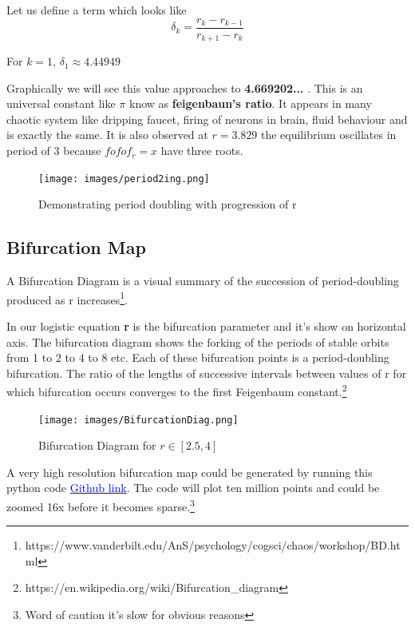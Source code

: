 \documentclass{report}
\begin{document}
Let us define a term which looks like
\begin{equation}
    \delta_k = \frac{r_k - r_{k-1}}{r_{k+1} - r_k}
\end{equation}

For $k = 1$, $\delta_1 \approx 4.44949$ \newline

Graphically we will see this value approaches to \textbf{4.669202...} . This is an universal constant like $\pi$ know as \textbf{feigenbaun's ratio}. It appears in many chaotic system like dripping faucet, firing of neurons in brain, fluid behaviour and is exactly the same.
It is also observed at $r = 3.829$ the equilibrium oscillates in period of 3 because $fofof_r = x$ have three roots. \newline

\begin{figure}[!h]
    \centering
    \texttt{[image: images/period2ing.png]}
    \caption{Demonstrating period doubling with progression of r}
    \label{fig:my_label3}
\end{figure}

\subsection{Bifurcation Map}
\raggedright
A Bifurcation Diagram is a visual summary of the succession of period-doubling produced as r increases\footnote[1]{https://www.vanderbilt.edu/AnS/psychology/cogsci/chaos/workshop/BD.html}.

In our logistic equation \textbf{r} is the bifurcation parameter and it's show on horizontal axis. The bifurcation diagram shows the forking of the periods of stable orbits from 1 to 2 to 4 to 8 etc. Each of these bifurcation points is a period-doubling bifurcation. The ratio of the lengths of successive intervals between values of r for which bifurcation occurs converges to the first Feigenbaum constant.\footnote[2]{https://en.wikipedia.org/wiki/Bifurcation\_diagram}

\begin{figure}[!h]
    \centering
    \texttt{[image: images/BifurcationDiag.png]}
    \caption{Bifurcation Diagram for $r \in [2.5,4]$}
    \label{fig:my_label4}
\end{figure}

A very high resolution bifurcation map could be generated by running this python code \href{https://github.com/notcamelcase01/ME5010Project/blob/master/high\_res\_bfmap.py}{\textcolor{blue}{Github link}}. The code will plot ten million points and could be zoomed 16x before it becomes sparse.\footnote[3]{Word of caution it's slow for obvious reasons}
\end{document}
